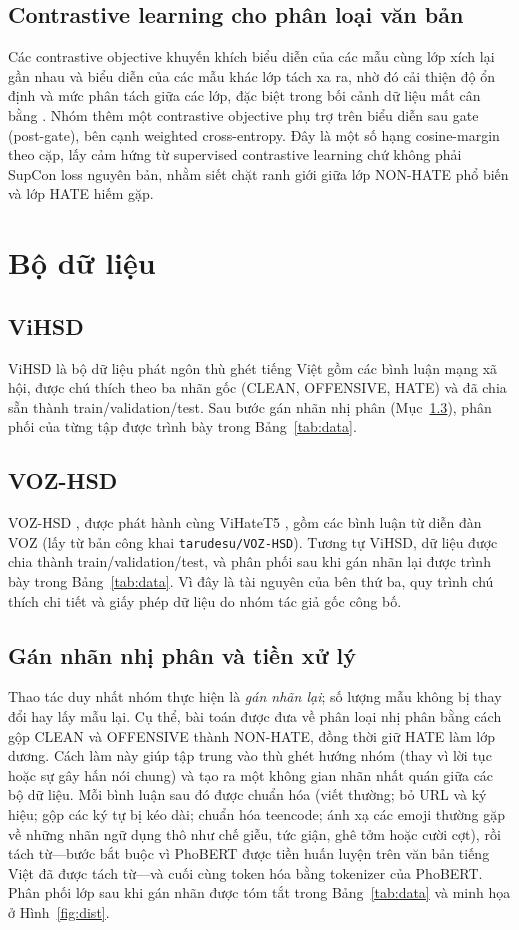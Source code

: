 \documentclass[11pt]{article}
\begin{document}
\subsection{Contrastive learning cho phân loại văn bản}
Các contrastive objective khuyến khích biểu diễn của các mẫu cùng lớp xích lại gần nhau và biểu diễn của các mẫu khác lớp tách xa ra, nhờ đó cải thiện độ ổn định và mức phân tách giữa các lớp, đặc biệt trong bối cảnh dữ liệu mất cân bằng \citep{supcon}. Nhóm thêm một contrastive objective phụ trợ trên biểu diễn sau gate (post-gate), bên cạnh weighted cross-entropy. Đây là một số hạng cosine-margin theo cặp, lấy cảm hứng từ supervised contrastive learning chứ không phải SupCon loss nguyên bản, nhằm siết chặt ranh giới giữa lớp NON-HATE phổ biến và lớp HATE hiếm gặp.

\section{Bộ dữ liệu}

\subsection{ViHSD}
ViHSD \citep{vihsd} là bộ dữ liệu phát ngôn thù ghét tiếng Việt gồm các bình luận mạng xã hội, được chú thích theo ba nhãn gốc (CLEAN, OFFENSIVE, HATE) và đã chia sẵn thành train/validation/test. Sau bước gán nhãn nhị phân (Mục~\ref{sec:reshape}), phân phối của từng tập được trình bày trong Bảng~\ref{tab:data}.

\subsection{VOZ-HSD}
VOZ-HSD \citep{vozhsd}, được phát hành cùng ViHateT5 \citep{vihatet5}, gồm các bình luận từ diễn đàn VOZ (lấy từ bản công khai \texttt{tarudesu/VOZ-HSD}). Tương tự ViHSD, dữ liệu được chia thành train/validation/test, và phân phối sau khi gán nhãn lại được trình bày trong Bảng~\ref{tab:data}. Vì đây là tài nguyên của bên thứ ba, quy trình chú thích chi tiết và giấy phép dữ liệu do nhóm tác giả gốc công bố.

\subsection{Gán nhãn nhị phân và tiền xử lý}
\label{sec:reshape}
Thao tác duy nhất nhóm thực hiện là \emph{gán nhãn lại}; số lượng mẫu không bị thay đổi hay lấy mẫu lại. Cụ thể, bài toán được đưa về phân loại nhị phân bằng cách gộp CLEAN và OFFENSIVE thành NON-HATE, đồng thời giữ HATE làm lớp dương. Cách làm này giúp tập trung vào thù ghét hướng nhóm (thay vì lời tục hoặc sự gây hấn nói chung) và tạo ra một không gian nhãn nhất quán giữa các bộ dữ liệu. Mỗi bình luận sau đó được chuẩn hóa (viết thường; bỏ URL và ký hiệu; gộp các ký tự bị kéo dài; chuẩn hóa teencode; ánh xạ các emoji thường gặp về những nhãn ngữ dụng thô như chế giễu, tức giận, ghê tởm hoặc cười cợt), rồi tách từ---bước bắt buộc vì PhoBERT được tiền huấn luyện trên văn bản tiếng Việt đã được tách từ---và cuối cùng token hóa bằng tokenizer của PhoBERT. Phân phối lớp sau khi gán nhãn được tóm tắt trong Bảng~\ref{tab:data} và minh họa ở Hình~\ref{fig:dist}.
\end{document}
